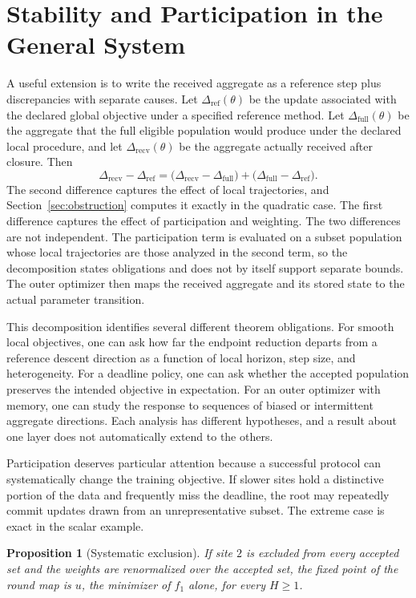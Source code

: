 \documentclass[11pt]{article}
\newtheorem{proposition}{Proposition}
\theoremstyle{definition}
\theoremstyle{remark}
\begin{document}
\section{Stability and Participation in the General System}\label{sec:stability}

A useful extension is to write the received aggregate as a reference step plus discrepancies with separate causes. Let $\Delta_{\mathrm{ref}}(\theta)$ be the update associated with the declared global objective under a specified reference method. Let $\Delta_{\mathrm{full}}(\theta)$ be the aggregate that the full eligible population would produce under the declared local procedure, and let $\Delta_{\mathrm{recv}}(\theta)$ be the aggregate actually received after closure. Then
\[
\Delta_{\mathrm{recv}}-\Delta_{\mathrm{ref}}
=\bigl(\Delta_{\mathrm{recv}}-\Delta_{\mathrm{full}}\bigr)
+\bigl(\Delta_{\mathrm{full}}-\Delta_{\mathrm{ref}}\bigr).
\]
The second difference captures the effect of local trajectories, and Section~\ref{sec:obstruction} computes it exactly in the quadratic case. The first difference captures the effect of participation and weighting. The two differences are not independent. The participation term is evaluated on a subset population whose local trajectories are those analyzed in the second term, so the decomposition states obligations and does not by itself support separate bounds. The outer optimizer then maps the received aggregate and its stored state to the actual parameter transition.

This decomposition identifies several different theorem obligations. For smooth local objectives, one can ask how far the endpoint reduction departs from a reference descent direction as a function of local horizon, step size, and heterogeneity. For a deadline policy, one can ask whether the accepted population preserves the intended objective in expectation. For an outer optimizer with memory, one can study the response to sequences of biased or intermittent aggregate directions. Each analysis has different hypotheses, and a result about one layer does not automatically extend to the others.

Participation deserves particular attention because a successful protocol can systematically change the training objective. If slower sites hold a distinctive portion of the data and frequently miss the deadline, the root may repeatedly commit updates drawn from an unrepresentative subset. The extreme case is exact in the scalar example.

\begin{proposition}[Systematic exclusion]\label{prop:exclusion}
If site $2$ is excluded from every accepted set and the weights are renormalized over the accepted set, the fixed point of the round map is $u$, the minimizer of $f_1$ alone, for every $H\ge1$.
\end{proposition}
\end{document}

